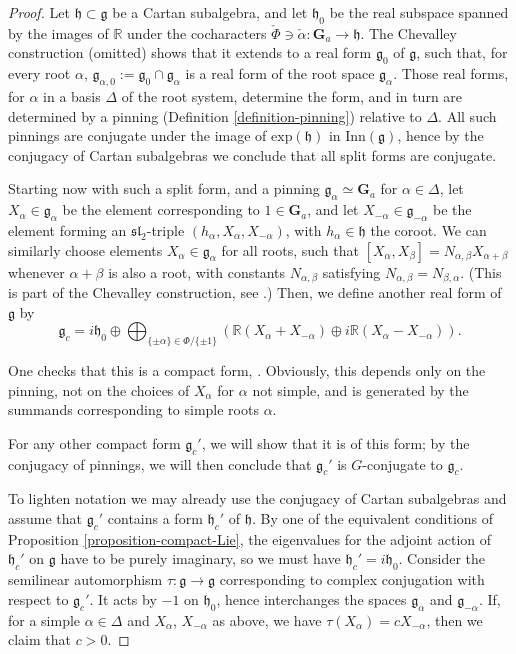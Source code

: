 \begin{proof}
 Let $\mathfrak h \subset \mathfrak g$ be a Cartan subalgebra, and let $\mathfrak h_0$ be the real subspace spanned by the images of $\mathbb R$ under the cocharacters $\check\Phi\ni \check\alpha: \mathbf{G}_a\to \mathfrak h$. The Chevalley construction (omitted) shows that it extends to a real form $\mathfrak g_0$ of $\mathfrak g$, such that, for every root $\alpha$, $\mathfrak g_{\alpha,0}:= \mathfrak g_0 \cap \mathfrak g_\alpha$ is a real form of the root space $\mathfrak g_\alpha$. Those real forms, for $\alpha$ in a basis $\Delta$ of the root system, determine the form, and in turn are determined by a pinning (Definition \ref{definition-pinning}) relative to $\Delta$. All such pinnings are conjugate under the image of $\text{exp}(\mathfrak h)$ in $\text{Inn}(\mathfrak g)$, hence by the conjugacy of Cartan subalgebras we conclude that all split forms are conjugate. 

 Starting now with such a split form, and a pinning $\mathfrak g_\alpha\simeq\mathbf G_a$ for $\alpha\in\Delta$, let $X_\alpha \in \mathfrak g_\alpha$ be the element corresponding to $1\in\mathbf G_a$, and let $X_{-\alpha}\in \mathfrak g_{-\alpha}$ be the element forming an $\mathfrak{sl}_2$-triple $(h_\alpha, X_\alpha, X_{-\alpha})$, with $h_\alpha\in\mathfrak h$ the coroot. We can similarly choose elements $X_\alpha\in\mathfrak g_\alpha$ for all roots, such that $[X_\alpha, X_\beta] = N_{\alpha, \beta} X_{\alpha+\beta}$ whenever $\alpha+\beta$ is also a root, with constants $N_{\alpha,\beta}$ satisfying $N_{\alpha,\beta} = N_{\beta,\alpha}$. (This is part of the Chevalley construction, see \cite[Ch.\ VIII \S 2]{Bourbaki-Lie}.) Then, we define another real form of $\mathfrak g$ by 
 $$ \mathfrak g_c = i \mathfrak h_0 \oplus \bigoplus_{\{\pm \alpha\}\in \Phi/\{\pm 1\}} \left( \mathbb R(X_\alpha+X_{-\alpha}) \oplus  i \mathbb R(X_\alpha - X_{-\alpha})\right ).$$
 
 One checks that this is a compact form, \cite[Ch.\ IX \S 3.2]{Bourbaki-Lie}.  Obviously, this depends only on the pinning, not on the choices of $X_\alpha$ for $\alpha$ not simple, and is generated by the summands corresponding to simple roots $\alpha$. 

  
 For any other compact form $\mathfrak g_c'$, we will show that it is of this form; by the conjugacy of pinnings, we will then conclude that $\mathfrak g_c'$ is $G$-conjugate to $\mathfrak g_c$. 
 
 To lighten notation we may already use the conjugacy of Cartan subalgebras and assume that $\mathfrak g_c'$ contains a form $\mathfrak h_c'$ of $\mathfrak h$. By one of the equivalent conditions of Proposition \ref{proposition-compact-Lie}, the eigenvalues for the adjoint action of $\mathfrak h_c'$ on $\mathfrak g$ have to be purely imaginary, so we must have $\mathfrak h_c' = i \mathfrak h_0$. Consider the semilinear automorphism $\tau:\mathfrak g\to\mathfrak g$ corresponding to complex conjugation with respect to $\mathfrak g_c'$. It acts by $-1$ on $\mathfrak h_0$, hence interchanges the spaces $\mathfrak g_\alpha$ and $\mathfrak g_{-\alpha}$. If, for a simple $\alpha\in \Delta$ and $X_\alpha$, $X_{-\alpha}$ as above, we have $\tau (X_\alpha) = c X_{-\alpha}$, then we claim that $c>0$. 
 

\end{proof}
